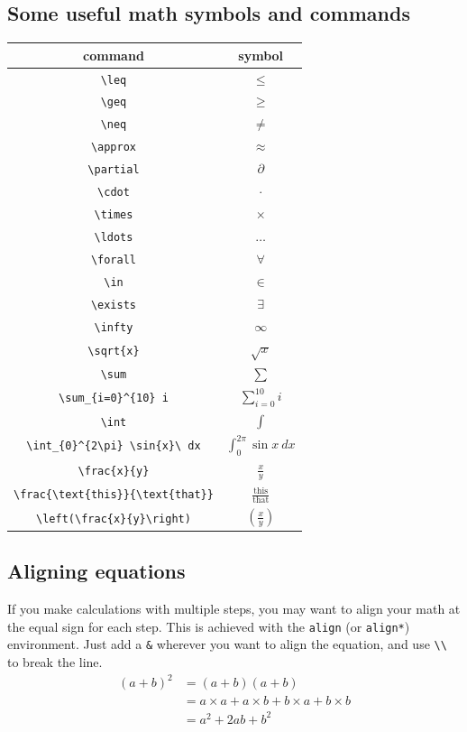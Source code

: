 \documentclass[letterus,times]{SIOpset}
\begin{document}
\subsection{Some useful math symbols and commands}
\begin{tabular}{|| c | c||}
\hline command   & symbol\\[0.2ex] 
 \hline\hline
\hline \verb|\leq| & $\leq$\\
\hline \verb|\geq| & $\geq$\\
\hline \verb|\neq| & $\neq$\\
\hline \verb|\approx| & $\approx$\\
\hline \verb|\partial| & $\partial$\\
\hline \verb|\cdot| & $\cdot$\\
\hline \verb|\times| & $\times$\\
\hline \verb|\ldots| & $\ldots$\\
\hline \verb|\forall| & $\forall$\\
\hline \verb|\in| & $\in$\\
\hline \verb|\exists| & $\exists$\\
\hline \verb|\infty| & $\infty$\\
\hline \verb|\sqrt{x}| & $\sqrt{x}$\\
\hline \verb|\sum| & $\sum$\\
\hline \verb|\sum_{i=0}^{10} i| & $\sum_{i=0}^{10} i$\\
\hline \verb|\int| & $\int$\\
\hline \verb|\int_{0}^{2\pi} \sin{x}\ dx| & $\int_{0}^{2\pi} \sin{x}\ dx$\\
\hline \verb|\frac{x}{y}| & $\frac{x}{y}$\\
\hline \verb|\frac{\text{this}}{\text{that}}| & $\frac{\text{this}}{\text{that}}$\\
\hline \verb|\left(\frac{x}{y}\right)| & $\left(\frac{x}{y}\right)$\\
\hline 
\end{tabular}

\subsection{Aligning equations}
If you make calculations with multiple steps, you may want to align your math at the equal sign for each step. This is achieved with the \verb|align| (or \verb|align*|) environment. Just add a \verb|&| wherever you want to align the equation, and use \verb|\\| to break the line. 
\begin{align*}
    \left(a + b\right)^2 &= (a + b) (a + b) \\
    &= a\times a + a\times b + b\times a + b\times b \\
    &= a^2 + 2ab + b^2
\end{align*}
\end{document}

